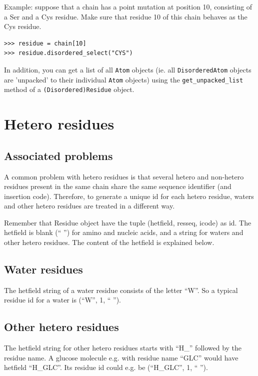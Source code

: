 Example: suppose that a chain has a point mutation at position 10,
consisting of a Ser and a Cys residue. Make sure that residue 10 of
this chain behaves as the Cys residue.
\begin{verbatim}
>>> residue = chain[10]
>>> residue.disordered_select("CYS")
\end{verbatim}
In addition, you can get a list of all \texttt{Atom} objects (ie.
all \texttt{DisorderedAtom} objects are 'unpacked' to their individual
\texttt{Atom} objects) using the \texttt{get\_unpacked\_list} method
of a \texttt{(Disordered)\-Residue} object.

\section{Hetero residues}

\subsection{Associated problems}
\label{sec:hetero_problems}

A common problem with hetero residues is that several hetero and non-hetero
residues present in the same chain share the same sequence identifier (and insertion
code). Therefore, to generate a unique id for each hetero residue, waters and
other hetero residues are treated in a different way.

Remember that Residue object have the tuple (hetfield, resseq, icode) as id.
The hetfield is blank (`` '') for amino and nucleic acids, and a string
for waters and other hetero residues. The content of the hetfield is explained
below.

\subsection{Water residues}

The hetfield string of a water residue consists of the letter ``W''. So
a typical residue id for a water is (``W'', 1, `` '').

\subsection{Other hetero residues}

The hetfield string for other hetero residues starts with ``H\_'' followed
by the residue name. A glucose molecule e.g. with residue name ``GLC''
would have hetfield ``H\_GLC''. Its residue id could e.g. be (``H\_GLC'',
1, `` '').

